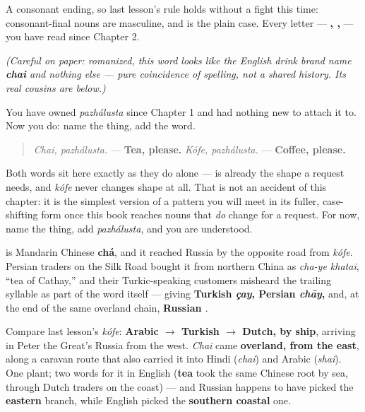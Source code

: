 A consonant ending, so last lesson's rule holds without a fight this time: consonant-final nouns are masculine, and \emph{} is the plain case. Every letter — \textbf{, , } — you have read since Chapter 2.

\emph{(Careful on paper: romanized, this word looks like the English drink brand name \textbf{chai} and nothing else — pure coincidence of spelling, not a shared history. Its real cousins are below.)}

\begin{grammarlens}[title={Grammar Lens: asking politely, at last}]
You have owned \emph{pazhálusta} since Chapter 1 and had nothing new to attach it to. Now you do: name the thing, add the word.

\begin{quote}
\emph{Chai, pazhálusta.} — \textbf{Tea, please.} \emph{Kófe, pazhálusta.} — \textbf{Coffee, please.}
\end{quote}

Both words sit here exactly as they do alone — \emph{} is already the shape a request needs, and \emph{kófe} never changes shape at all. That is not an accident of this chapter: it is the simplest version of a pattern you will meet in its fuller, case-shifting form once this book reaches nouns that \emph{do} change for a request. For now, name the thing, add \emph{pazhálusta}, and you are understood.
\end{grammarlens}

\begin{cousinweb}
\textbf{} is Mandarin Chinese \textbf{chá}, and it reached Russia by the opposite road from \emph{kófe}. Persian traders on the Silk Road bought it from northern China as \emph{cha-ye khatai}, \textquotedblleft{}tea of Cathay,\textquotedblright{} and their Turkic-speaking customers misheard the trailing syllable as part of the word itself — giving \textbf{Turkish \emph{çay}, Persian \emph{chāy},} and, at the end of the same overland chain, \textbf{Russian \emph{}}.

Compare last lesson's \emph{kófe}: \textbf{Arabic $\to$ Turkish $\to$ Dutch, by ship}, arriving in Peter the Great's Russia from the west. \emph{Chai} came \textbf{overland, from the east}, along a caravan route that also carried it into Hindi (\emph{chai}) and Arabic (\emph{shai}). One plant; two words for it in English (\textbf{tea} took the same Chinese root by sea, through Dutch traders on the coast) — and Russian happens to have picked the \textbf{eastern} branch, while English picked the \textbf{southern coastal} one.
\end{cousinweb}

